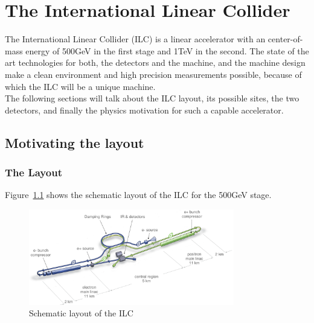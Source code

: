 \chapter{The International Linear Collider}
\label{ILC}
The International Linear Collider (ILC) is a linear \electron \positron accelerator with an center-of-mass energy of \unit{500}{GeV} in the first stage and \unit{1}{TeV} in the second.
The state of the art technologies for both, the detectors and the machine, and the machine design make a clean environment and high precision measurements possible, because of which the ILC will be a unique machine.\\
The following sections will talk about the ILC layout, its possible sites, the two detectors, and finally the physics motivation for such a capable accelerator.

\section{Motivating the layout}
\label{ILC:layout}

\subsection{The Layout}
Figure~\ref{fig:ILC_Layout} shows the schematic layout of the ILC for the \unit{500}{GeV} stage.
\begin{figure}
\centering
\includegraphics[width=0.8\textwidth]{Figures/ILC_layout.png}
\caption[Schematic layout of the ILC]{Schematic layout of the ILC~\cite[p. 9]{TDR1}}
\label{fig:ILC_Layout}
\end{figure}

